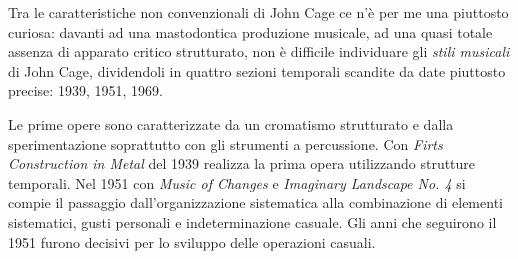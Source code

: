 \documentclass[%
			   a4paper,
			   twoside
			   ]{book}
\begin{document}
\begin{multicols}{2}
Tra le caratteristiche non convenzionali di John Cage ce n'è per me una piuttosto
curiosa: davanti ad una mastodontica produzione musicale, ad una quasi totale
assenza di apparato critico strutturato, non è difficile individuare gli
\emph{stili musicali} di John Cage, dividendoli in quattro sezioni temporali
scandite da date piuttosto precise: 1939, 1951, 1969.

Le prime opere sono caratterizzate da un cromatismo strutturato e dalla
sperimentazione soprattutto con gli strumenti a percussione.
Con \emph{Firts Construction in Metal} del 1939 realizza la prima opera
utilizzando strutture temporali. Nel 1951 con \emph{Music of Changes} e
\emph{Imaginary Landscape No. 4} si compie il passaggio dall'organizzazione
sistematica alla combinazione di elementi sistematici, gusti personali e
indeterminazione casuale. Gli anni che seguirono il 1951 furono decisivi per
lo sviluppo delle operazioni casuali.


\end{multicols}
\end{document}
